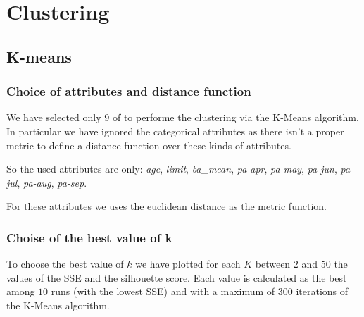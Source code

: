  \chapter{Clustering}

\section{K-means}
\subsection{Choice of attributes and distance function}

We have selected only $9$ of to performe the clustering via the K-Means algorithm.
In particular we have ignored the categorical attributes as there isn't a proper metric to define a distance function over these kinds of attributes.

So the used attributes are only: \textit{age}, \textit{limit}, \textit{ba\_mean}, \textit{pa-apr}, \textit{pa-may}, \textit{pa-jun}, \textit{pa-jul}, \textit{pa-aug}, \textit{pa-sep}.

For these attributes we uses the euclidean distance as the metric function.

\subsection{Choise of the best value of k}

To choose the best value of $k$ we have plotted for each $K$ between $2$ and $50$ the values of the SSE and the silhouette score. Each value is calculated as the best among $10$ runs (with the lowest SSE) and with a maximum of $300$ iterations of the K-Means algorithm.

